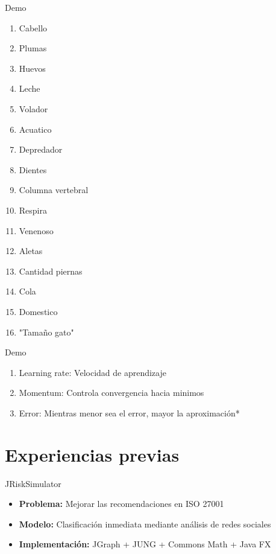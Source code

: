 \documentclass{beamer}
\begin{document}
\begin{frame}{Demo}
    \begin{enumerate}
        \item Cabello
        \item Plumas
        \item Huevos
        \item Leche
        \item Volador
        \item Acuatico
        \item Depredador
        \item Dientes
        \item Columna vertebral
        \item Respira
        \item Venenoso
        \item Aletas
        \item Cantidad piernas
        \item Cola
        \item Domestico
        \item "Tamaño gato"
   \end{enumerate}
\end{frame}

\begin{frame}{Demo}
    \begin{enumerate}
        \item Learning rate: Velocidad de aprendizaje
        \item Momentum: Controla convergencia hacia minimos
        \item Error: Mientras menor sea el error, mayor la aproximación*
    \end{enumerate}
\end{frame}

\section{Experiencias previas}

\begin{frame}{JRiskSimulator}
    \begin{itemize}
        \item \textbf{Problema:} Mejorar las recomendaciones en ISO 27001
        \item \textbf{Modelo: } Clasificación inmediata mediante análisis de redes sociales
        \item \textbf{Implementación: }  JGraph + JUNG + Commons Math + Java FX
    \end{itemize}
\end{frame}
\end{document}

